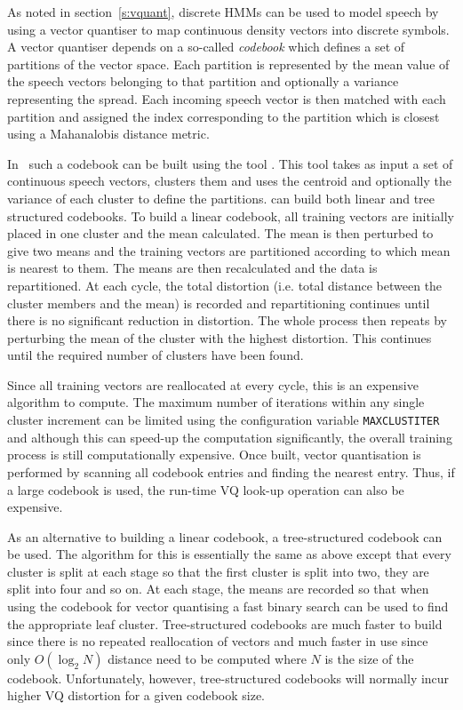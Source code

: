 
As noted in section~\ref{s:vquant}, discrete HMMs can be used to model
speech by using a vector quantiser to map continuous density vectors into
discrete symbols.  A vector quantiser depends on a so-called \textit{codebook} 
which defines a set of partitions of the vector space.  Each partition
is represented by the mean value of the speech vectors belonging
to that partition and optionally  a variance representing the spread.
Each incoming speech vector is then
matched with each partition and assigned the index corresponding
to the partition which is closest using a Mahanalobis distance metric.

In \HTK\ such a codebook can be built using the tool .  This tool
takes as input a set of continuous speech vectors, clusters them and uses
the centroid and optionally the variance of each cluster to define
the partitions.   can build both linear and tree structured
codebooks.  To build a linear codebook, all training vectors are initially
placed in one cluster and the mean calculated.  The mean is then perturbed
to give two means and the training vectors are partitioned according to
which mean is nearest to them.  The means are then recalculated and the
data is repartitioned.  At each cycle, the total distortion (i.e. total
distance between the cluster members and the mean) is recorded and repartitioning
continues until there is no significant reduction in distortion.  The whole
process then repeats by perturbing the mean of the cluster with the highest
distortion.  This continues until the required number of clusters have been
found.

Since all training vectors are reallocated at every cycle, this is an
expensive algorithm to compute.  The maximum number of iterations within
any single cluster increment can be limited using the configuration
variable \texttt{MAXCLUSTITER} 
and although this can speed-up the computation
significantly, the overall training process is still computationally expensive.
Once built, vector quantisation is performed by scanning all codebook
entries and finding the nearest entry.  Thus, if a large codebook is used,
the run-time VQ look-up operation can also be expensive.

As an alternative to building a linear codebook, a tree-structured codebook
can be used.  The algorithm for this is essentially the same as above
except that every cluster is split at each stage so that the first cluster
is split into two, they are split into four and so on.  At each stage, the
means are recorded so that when using the codebook for vector quantising
a fast binary search can be used to find the appropriate leaf cluster.
Tree-structured codebooks are much faster to build since there is no
repeated reallocation of vectors and much faster in use since only $O(\log_2 N)$
distance need to be computed where $N$ is the size of the codebook.
Unfortunately, however, tree-structured codebooks will normally incur higher 
VQ distortion for a given codebook size.

